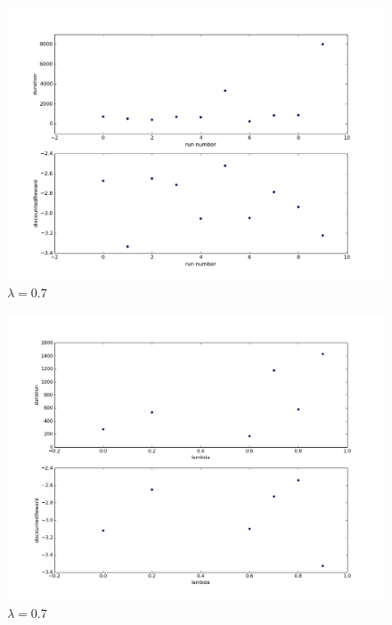 \documentclass{article}
\begin{document}
\begin{figure}
\centering
\includegraphics[scale=0.5]{figures/sarsaMultiple.png}
\caption{$\lambda = 0.7$}
\label{figures/sarsaMultiple.png}
\end{figure}


\begin{figure}
\centering
\includegraphics[scale=0.5]{figures/discreteQLearningLamComparison.png}
\caption{$\lambda = 0.7$}
\label{figures/discreteQLearningLamComparison.png}
\end{figure}
\end{document}
